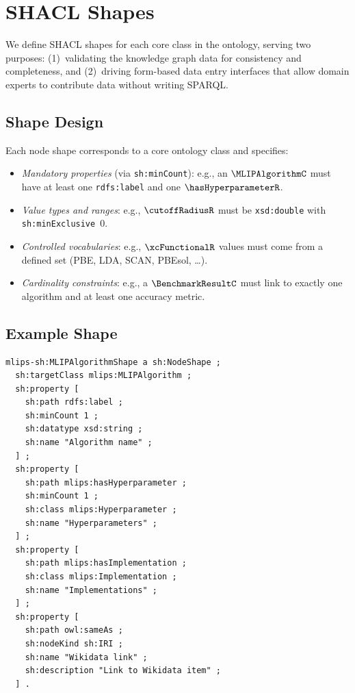 \section{SHACL Shapes}
\label{sec:shacl}

We define SHACL shapes for each core class in the ontology, serving two
purposes: (1)~validating the knowledge graph data for consistency and
completeness, and (2)~driving form-based data entry interfaces that allow
domain experts to contribute data without writing SPARQL.

\subsection{Shape Design}

Each node shape corresponds to a core ontology class and specifies:

\begin{itemize}
\item \emph{Mandatory properties} (via \texttt{sh:minCount}): e.g., an
  $\MLIPAlgorithmC$ must have at least one \texttt{rdfs:label}
  and one $\hasHyperparameterR$.
\item \emph{Value types and ranges}: e.g., $\cutoffRadiusR$
  must be \texttt{xsd:double} with \texttt{sh:min\-Exclusive}~$0$.
\item \emph{Controlled vocabularies}: e.g., $\xcFunctionalR$
  values must come from a defined set (PBE, LDA, SCAN, PBEsol, \ldots).
\item \emph{Cardinality constraints}: e.g., a $\BenchmarkResultC$
  must link to exactly one algorithm and at least one accuracy metric.
\end{itemize}

\subsection{Example Shape}

\begin{lstlisting}[language=turtle, caption={SHACL shape for MLIPAlgorithm (excerpt).}]
mlips-sh:MLIPAlgorithmShape a sh:NodeShape ;
  sh:targetClass mlips:MLIPAlgorithm ;
  sh:property [
    sh:path rdfs:label ;
    sh:minCount 1 ;
    sh:datatype xsd:string ;
    sh:name "Algorithm name" ;
  ] ;
  sh:property [
    sh:path mlips:hasHyperparameter ;
    sh:minCount 1 ;
    sh:class mlips:Hyperparameter ;
    sh:name "Hyperparameters" ;
  ] ;
  sh:property [
    sh:path mlips:hasImplementation ;
    sh:class mlips:Implementation ;
    sh:name "Implementations" ;
  ] ;
  sh:property [
    sh:path owl:sameAs ;
    sh:nodeKind sh:IRI ;
    sh:name "Wikidata link" ;
    sh:description "Link to Wikidata item" ;
  ] .
\end{lstlisting}

